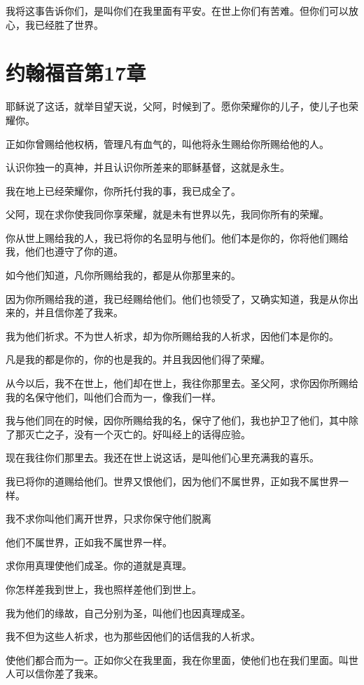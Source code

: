 \documentclass[12pt,oneside]{book}
\begin{document}
我将这事告诉你们，是叫你们在我里面有平安。在世上你们有苦难。但你们可以放心，我已经胜了世界。

\chapter{约翰福音第17章}
耶稣说了这话，就举目望天说，父阿，时候到了。愿你荣耀你的儿子，使儿子也荣耀你。

正如你曾赐给他权柄，管理凡有血气的，叫他将永生赐给你所赐给他的人。

认识你独一的真神，并且认识你所差来的耶稣基督，这就是永生。

我在地上已经荣耀你，你所托付我的事，我已成全了。

父阿，现在求你使我同你享荣耀，就是未有世界以先，我同你所有的荣耀。

你从世上赐给我的人，我已将你的名显明与他们。他们本是你的，你将他们赐给我，他们也遵守了你的道。

如今他们知道，凡你所赐给我的，都是从你那里来的。

因为你所赐给我的道，我已经赐给他们。他们也领受了，又确实知道，我是从你出来的，并且信你差了我来。

我为他们祈求。不为世人祈求，却为你所赐给我的人祈求，因他们本是你的。

凡是我的都是你的，你的也是我的。并且我因他们得了荣耀。

从今以后，我不在世上，他们却在世上，我往你那里去。圣父阿，求你因你所赐给我的名保守他们，叫他们合而为一，像我们一样。

我与他们同在的时候，因你所赐给我的名，保守了他们，我也护卫了他们，其中除了那灭亡之子，没有一个灭亡的。好叫经上的话得应验。

现在我往你们那里去。我还在世上说这话，是叫他们心里充满我的喜乐。

我已将你的道赐给他们。世界又恨他们，因为他们不属世界，正如我不属世界一样。

我不求你叫他们离开世界，只求你保守他们脱离

他们不属世界，正如我不属世界一样。

求你用真理使他们成圣。你的道就是真理。

你怎样差我到世上，我也照样差他们到世上。

我为他们的缘故，自己分别为圣，叫他们也因真理成圣。

我不但为这些人祈求，也为那些因他们的话信我的人祈求。

使他们都合而为一。正如你父在我里面，我在你里面，使他们也在我们里面。叫世人可以信你差了我来。
\end{document}
